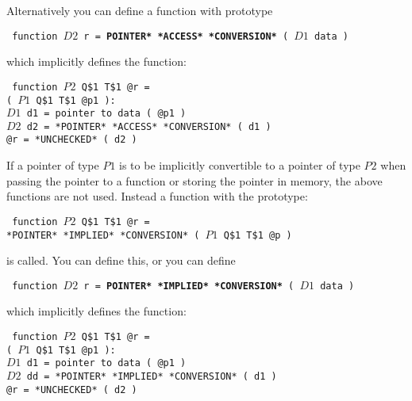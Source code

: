 \documentclass[12pt]{article}
\newcommand{\ttkey}[1]{{\tt \bfseries #1}}
\newenvironment{indpar}[1][0.3in]%
	{\begin{list}{}%
		     {\setlength{\itemsep}{0in}%
		      \setlength{\topsep}{0in}%
		      \setlength{\parsep}{1ex}%
		      \setlength{\labelwidth}{#1}%
		      \setlength{\leftmargin}{#1}%
		      \addtolength{\leftmargin}{\labelsep}}%
	 \item}%
	{\end{list}}
\begin{document}
Alternatively you can define a function with prototype
\begin{indpar} \tt
function $D2$ r = \ttkey{*POINTER* *ACCESS* *CONVERSION*} ( $D1$ data )
\end{indpar}
which implicitly defines the function:
\begin{indpar} \tt
function $P2$ Q\$1 T\$1 @r = \\
\hspace*{1in}\ttkey{*POINTER* *ACCESS* *CONVERSION*}
	( $P1$ Q\$1 T\$1 @p1 ): \\
\hspace*{0.3in}$D1$ d1 = pointer to data ( @p1 ) \\
\hspace*{0.3in}$D2$ d2 = *POINTER* *ACCESS* *CONVERSION* ( d1 ) \\
\hspace*{0.3in}@r = *UNCHECKED* ( d2 )
\end{indpar}

If a pointer of type $P1$ is to be implicitly
convertible to a pointer of type $P2$ when passing the
pointer to a function or storing the pointer in memory,
the above functions are not used.  Instead a function with
the prototype:
\begin{indpar} \tt
function $P2$ Q\$1 T\$1 @r = \\
\hspace*{1in}*POINTER* *IMPLIED* *CONVERSION* ( $P1$ Q\$1 T\$1 @p )
\end{indpar}
is called.  You can define this, or you can define
\begin{indpar} \tt
function $D2$ r = \ttkey{*POINTER* *IMPLIED* *CONVERSION*} ( $D1$ data )
\end{indpar}
which implicitly defines the function:
\begin{indpar} \tt
function $P2$ Q\$1 T\$1 @r = \\
\hspace*{1in}\ttkey{*POINTER* *IMPLIED* *CONVERSION*}
	( $P1$ Q\$1 T\$1 @p1 ): \\
\hspace*{0.3in}$D1$ d1 = pointer to data ( @p1 ) \\
\hspace*{0.3in}$D2$ dd = *POINTER* *IMPLIED* *CONVERSION* ( d1 ) \\
\hspace*{0.3in}@r = *UNCHECKED* ( d2 )
\end{indpar}
\end{document}
